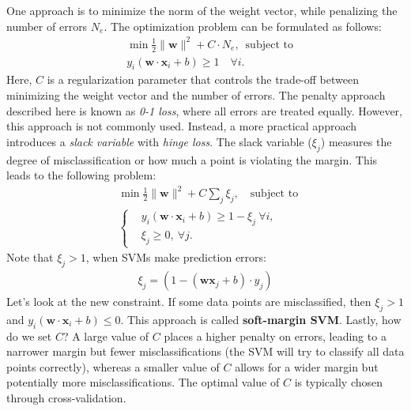 One approach is to minimize the norm of the weight vector, while penalizing the number of errors $N_e$. The optimization problem can be formulated as follows:
\begin{align*}
	&\min \frac{1}{2}\lVert \mathbf{w}\rVert^2 +C\cdot N_{e},\, \text{ subject to}\\
	&y_i(\mathbf{w}\cdot \mathbf{x}_i+b)\geq 1 \quad \forall i.
\end{align*}
Here, $C$ is a regularization parameter that controls the trade-off between minimizing the weight vector and the number of errors. The penalty approach described here is known as \textit{0-1 loss}, where all errors are treated equally. However, this approach is not commonly used. Instead, a more practical approach introduces a \textit{slack variable} with \textit{hinge loss}. The slack variable ($\xi_j$) measures the degree of misclassification or how much a point is violating the margin. This leads to the following problem:
\begin{align*}
	&\min \frac{1}{2}\lVert \mathbf{w}\rVert^2 +C\sum_j\xi_j ,\quad \textrm{subject to }\\
		 &\begin{cases}
		&y_i(\mathbf{w}\cdot \mathbf{x}_i+b)\geq 1-\xi_j \ \forall i,\quad \\
		&\xi_j\geq 0,\ \forall j.
	\end{cases}
\end{align*}
Note that $\xi_j>1$, when SVMs make prediction errors:
\begin{align*}
	\xi_j = \left(1-(\mathbf{w}\mathbf{x}_j+b)\cdot y_j\right)
\end{align*}
Let's look at the new constraint. If some data points are misclassified, then $\xi_j>1$ and $y_i(\mathbf{w}\cdot \mathbf{x}_i+b)\leq 0$. This approach is called \textbf{soft-margin SVM}. Lastly, how do we set $C$? A large value of $C$ places a higher penalty on errors, leading to a narrower margin but fewer misclassifications (\ie  the SVM will try to classify all data points correctly), whereas a smaller value of $C$ allows for a wider margin but potentially more misclassifications. The optimal value of $C$ is typically chosen through cross-validation.



